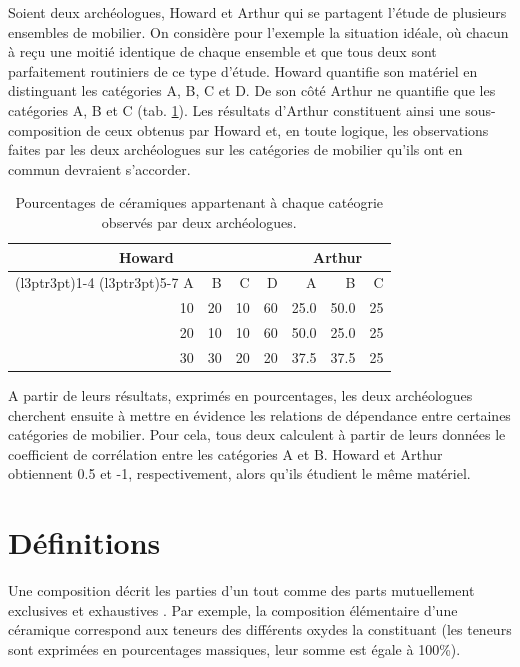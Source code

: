 \documentclass[
  french,
]{scrbook}
\begin{document}
Soient deux archéologues, Howard et Arthur qui se partagent l'étude de plusieurs ensembles de mobilier. On considère pour l'exemple la situation idéale, où chacun à reçu une moitié identique de chaque ensemble et que tous deux sont parfaitement routiniers de ce type d'étude. Howard quantifie son matériel en distinguant les catégories A, B, C et D. De son côté Arthur ne quantifie que les catégories A, B et C (tab. \ref{tab:coda-subcoherence}). Les résultats d'Arthur constituent ainsi une sous-composition de ceux obtenus par Howard et, en toute logique, les observations faites par les deux archéologues sur les catégories de mobilier qu'ils ont en commun devraient s'accorder.

\begin{table}

\caption{\label{tab:coda-subcoherence}Pourcentages de céramiques appartenant à chaque catéogrie observés par deux archéologues.}
\centering
\begin{tabular}[t]{rrrrrrr}
\toprule
\multicolumn{4}{c}{Howard} & \multicolumn{3}{c}{Arthur} \\
\cmidrule(l{3pt}r{3pt}){1-4} \cmidrule(l{3pt}r{3pt}){5-7}
A & B & C & D & A & B & C\\
\midrule
10 & 20 & 10 & 60 & 25.0 & 50.0 & 25\\
20 & 10 & 10 & 60 & 50.0 & 25.0 & 25\\
30 & 30 & 20 & 20 & 37.5 & 37.5 & 25\\
\bottomrule
\end{tabular}
\end{table}

A partir de leurs résultats, exprimés en pourcentages, les deux archéologues cherchent ensuite à mettre en évidence les relations de dépendance entre certaines catégories de mobilier. Pour cela, tous deux calculent à partir de leurs données le coefficient de corrélation entre les catégories A et B. Howard et Arthur obtiennent 0.5 et -1, respectivement, alors qu'ils étudient le même matériel.

\hypertarget{coda-definitions}{%
\section{Définitions}\label{coda-definitions}}

Une composition décrit les parties d'un tout comme des parts mutuellement exclusives et exhaustives \autocite{aitchison1982,aitchison1986}. Par exemple, la composition élémentaire d'une céramique correspond aux teneurs des différents oxydes la constituant (les teneurs sont exprimées en pourcentages massiques, leur somme est égale à 100\%).
\end{document}
